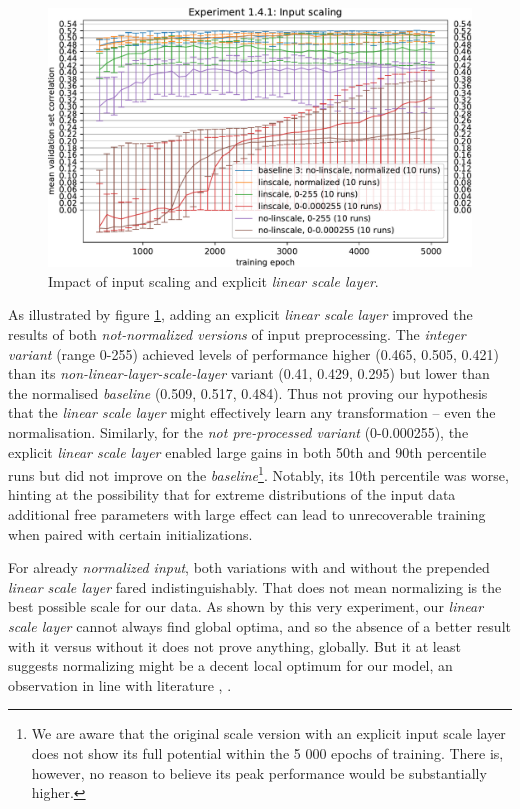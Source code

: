 \begin{figure}[H]
    \centering
    \includegraphics[width=1\textwidth]{../figures/05_1_4_1}
    \caption[Experiment 1.4.1]{Impact of input scaling and explicit \textit{linear scale layer}.}
    \label{fig:5.1.4.1}
\end{figure}

As illustrated by figure \ref{fig:5.1.4.1}, adding an explicit \textit{linear scale layer} improved the results of both \textit{not-normalized versions} of input preprocessing. The \textit{integer variant} (range 0-255) achieved levels of performance higher (0.465, 0.505, 0.421) than its \textit{non-linear-layer-scale-layer} variant (0.41, 0.429, 0.295) but lower than the normalised \textit{baseline} (0.509, 0.517, 0.484). Thus not proving our hypothesis that the \textit{linear scale layer} might effectively learn any transformation -- even the normalisation. Similarly, for the \textit{not pre-processed variant} (0-0.000255), the explicit \textit{linear scale layer} enabled large gains in both 50th and 90th percentile runs but did not improve on the \textit{baseline}\footnote{We are aware that the original scale version with an explicit input scale layer does not show its full potential within the 5 000 epochs of training. There is, however, no reason to believe its peak performance would be substantially higher.}. Notably, its 10th percentile was worse, hinting at the possibility that for extreme distributions of the input data additional free parameters with large effect can lead to unrecoverable training when paired with certain initializations.

For already \textit{normalized input}, both variations with and without the prepended \textit{linear scale layer} fared indistinguishably. That does not mean normalizing is the best possible scale for our data. As shown by this very experiment, our \textit{linear scale layer} cannot always find global optima, and so the absence of a better result with it versus without it does not prove anything, globally. But it at least suggests normalizing might be a decent local optimum for our model, an observation in line with literature \citep{Goodfellow-et-al-2016}, \citep{Jin2015}.


